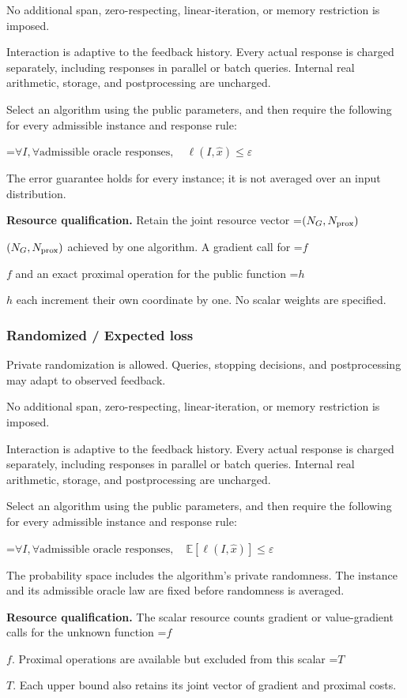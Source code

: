 \documentclass[10pt,a4paper]{article}
\newcommand{\AtlasMath}[1]{\par\begingroup\centering\setbox0=\hbox{$\displaystyle #1$}\ifdim\wd0>1.4\linewidth\typeout{ATLAS WIDE FORMULA: \the\wd0}\fi\ifdim\wd0>\linewidth\resizebox{\linewidth}{!}{\box0}\else\box0\fi\par\endgroup}
\newcommand{\AtlasInlineMath}[1]{\begingroup\setbox0=\hbox{$#1$}\ifdim\wd0>.4\linewidth\endgroup\AtlasMath{#1}\else\endgroup$#1$\fi}
\begin{document}
No additional span, zero-respecting, linear-iteration, or memory restriction is imposed.

Interaction is adaptive to the feedback history. Every actual response is charged separately, including responses in parallel or batch queries. Internal real arithmetic, storage, and postprocessing are uncharged.

Select an algorithm using the public parameters, and then require the following for every admissible instance and response rule:


\AtlasMath{\forall I,\forall\text{admissible oracle responses},\quad\ell(I,\widehat{x})\le\varepsilon}


The error guarantee holds for every instance; it is not averaged over an input distribution.

\textbf{Resource qualification.} Retain the joint resource vector \AtlasInlineMath{(N_G,N_{\rm prox})} achieved by one algorithm. A gradient call for \AtlasInlineMath{f} and an exact proximal operation for the public function \AtlasInlineMath{h} each increment their own coordinate by one. No scalar weights are specified.

\subsubsection{Randomized / Expected loss}
Private randomization is allowed. Queries, stopping decisions, and postprocessing may adapt to observed feedback.

No additional span, zero-respecting, linear-iteration, or memory restriction is imposed.

Interaction is adaptive to the feedback history. Every actual response is charged separately, including responses in parallel or batch queries. Internal real arithmetic, storage, and postprocessing are uncharged.

Select an algorithm using the public parameters, and then require the following for every admissible instance and response rule:


\AtlasMath{\forall I,\forall\text{admissible oracle responses},\quad\mathbb{E}[\ell(I,\widehat{x})]\le\varepsilon}


The probability space includes the algorithm's private randomness. The instance and its admissible oracle law are fixed before randomness is averaged.

\textbf{Resource qualification.} The scalar resource counts gradient or value-gradient calls for the unknown function \AtlasInlineMath{f}. Proximal operations are available but excluded from this scalar \AtlasInlineMath{T}. Each upper bound also retains its joint vector of gradient and proximal costs.
\end{document}
